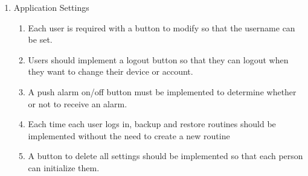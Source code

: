 \begin{enumerate}[label=\arabic*.]
    \item {\large{Application Settings}}\\
          \begin{enumerate}[label*={\arabic*.},ref=\theenumi.\arabic*]
              \setlength{\itemindent}{0.5cm}
              \item Each user is required with a button to modify so that the username can be set.\\

              \item Users should implement a logout button so that they can logout when they want to change their device or account.\\

              \item A push alarm on/off button must be implemented to determine whether or not to receive an alarm.\\

              \item Each time each user logs in, backup and restore routines should be implemented without the need to create a new routine\\

              \item A button to delete all settings should be implemented so that each person can initialize them.\\

          \end{enumerate}
\end{enumerate}